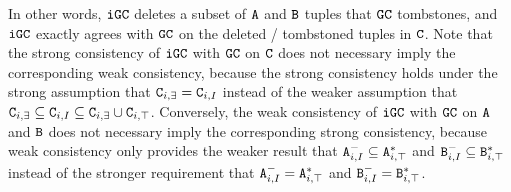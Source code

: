 \documentclass{article}
\numberwithin{equation}{section}
\newtheorem{property}{Property}[section]
\renewcommand{\tt}[1]{\ifmmode\text{\texttt{#1}}\else\texttt{#1}\fi}
\begin{document}

In other words, $\tt{iGC}$ deletes a subset of $\tt{A}$ and $\tt{B}$ tuples that $\tt{GC}$ tombstones, and $\tt{iGC}$ exactly agrees with $\tt{GC}$ on the deleted / tombstoned tuples in $\tt{C}$.
Note that the strong consistency of $\tt{iGC}$ with $\tt{GC}$ on $\tt{C}$ does not necessary imply the corresponding weak consistency, because the strong consistency holds under the strong assumption that $\tt{C}_{i,\exists} = \tt{C}_{i,I}$ instead of the weaker assumption that $\tt{C}_{i,\exists} \subseteq \tt{C}_{i,I} \subseteq \tt{C}_{i,\exists} \cup \tt{C}_{i,\top}$.
Conversely, the weak consistency of $\tt{iGC}$ with $\tt{GC}$ on $\tt{A}$ and $\tt{B}$ does not necessary imply the corresponding strong consistency, because weak consistency only provides the weaker result that $\tt{A}_{i,I}^- \subseteq \tt{A}_{i,\top}^*$ and $\tt{B}_{i,I}^- \subseteq \tt{B}_{i,\top}^*$ instead of the stronger requirement that $\tt{A}_{i,I}^- = \tt{A}_{i,\top}^*$ and $\tt{B}_{i,I}^- = \tt{B}_{i,\top}^*$.
\end{document}
